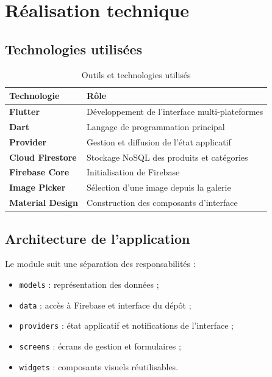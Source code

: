 \documentclass[12pt,a4paper]{report}
\begin{document}
\chapter{Réalisation technique}

\section{Technologies utilisées}

\begin{table}[H]
\centering
\caption{Outils et technologies utilisés}
\begin{tabularx}{\textwidth}{>{\bfseries}p{3cm}X}
\toprule
Technologie & Rôle \\
\midrule
Flutter & Développement de l'interface multi-plateformes \\
Dart & Langage de programmation principal \\
Provider & Gestion et diffusion de l'état applicatif \\
Cloud Firestore & Stockage NoSQL des produits et catégories \\
Firebase Core & Initialisation de Firebase \\
Image Picker & Sélection d'une image depuis la galerie \\
Material Design & Construction des composants d'interface \\
\bottomrule
\end{tabularx}
\end{table}

\section{Architecture de l'application}

Le module suit une séparation des responsabilités :
\begin{itemize}[label=\textbullet]
  \item \texttt{models} : représentation des données ;
  \item \texttt{data} : accès à Firebase et interface du dépôt ;
  \item \texttt{providers} : état applicatif et notifications de l'interface ;
  \item \texttt{screens} : écrans de gestion et formulaires ;
  \item \texttt{widgets} : composants visuels réutilisables.
\end{itemize}
\end{document}

